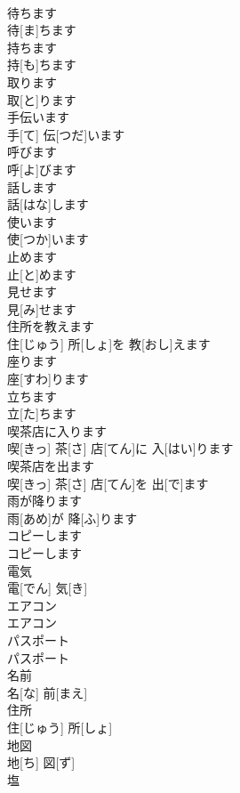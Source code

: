\documentclass[8pt]{extreport}
\begin{document}
\begin{CJK}{UTF8}{min}
\\	待ちます	
\\	待[ま]ちます		
\\	持ちます	
\\	持[も]ちます		
\\	取ります	
\\	取[と]ります		
\\	手伝います	
\\	手[て] 伝[つだ]います		
\\	呼びます	
\\	呼[よ]びます		
\\	話します	
\\	話[はな]します		
\\	使います	
\\	使[つか]います		
\\	止めます	
\\	止[と]めます		
\\	見せます	
\\	見[み]せます		
\\	住所を教えます	
\\	住[じゅう] 所[しょ]を 教[おし]えます		
\\	座ります	
\\	座[すわ]ります		
\\	立ちます	
\\	立[た]ちます		
\\	喫茶店に入ります	
\\	喫[きっ] 茶[さ] 店[てん]に 入[はい]ります		
\\	喫茶店を出ます	
\\	喫[きっ] 茶[さ] 店[てん]を 出[で]ます		
\\	雨が降ります	
\\	雨[あめ]が 降[ふ]ります		
\\	コピーします	
\\	コピーします		
\\	電気	
\\	電[でん] 気[き]		
\\	エアコン	
\\	エアコン		
\\	パスポート	
\\	パスポート		
\\	名前	
\\	名[な] 前[まえ]		
\\	住所	
\\	住[じゅう] 所[しょ]		
\\	地図	
\\	地[ち] 図[ず]		
\\	塩	

\end{CJK}
\end{document}
